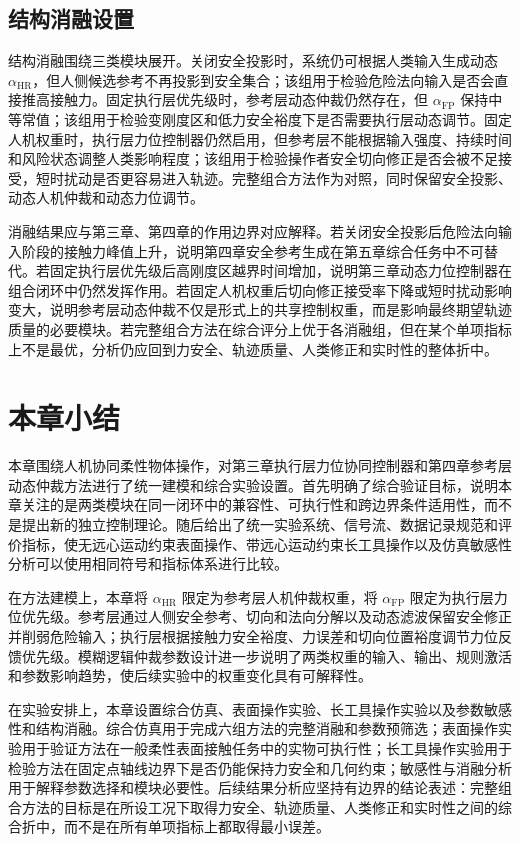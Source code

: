 \subsection{结构消融设置}
\label{subsec:ch5_ablation_setting}

结构消融围绕三类模块展开。关闭安全投影时，系统仍可根据人类输入生成动态 $\alpha_{\mathrm{HR}}$，但人侧候选参考不再投影到安全集合；该组用于检验危险法向输入是否会直接推高接触力。固定执行层优先级时，参考层动态仲裁仍然存在，但 $\alpha_{\mathrm{FP}}$ 保持中等常值；该组用于检验变刚度区和低力安全裕度下是否需要执行层动态调节。固定人机权重时，执行层力位控制器仍然启用，但参考层不能根据输入强度、持续时间和风险状态调整人类影响程度；该组用于检验操作者安全切向修正是否会被不足接受，短时扰动是否更容易进入轨迹。完整组合方法作为对照，同时保留安全投影、动态人机仲裁和动态力位调节。

消融结果应与第三章、第四章的作用边界对应解释。若关闭安全投影后危险法向输入阶段的接触力峰值上升，说明第四章安全参考生成在第五章综合任务中不可替代。若固定执行层优先级后高刚度区越界时间增加，说明第三章动态力位控制器在组合闭环中仍然发挥作用。若固定人机权重后切向修正接受率下降或短时扰动影响变大，说明参考层动态仲裁不仅是形式上的共享控制权重，而是影响最终期望轨迹质量的必要模块。若完整组合方法在综合评分上优于各消融组，但在某个单项指标上不是最优，分析仍应回到力安全、轨迹质量、人类修正和实时性的整体折中。

\section{本章小结}
\label{sec:ch5_summary}

本章围绕人机协同柔性物体操作，对第三章执行层力位协同控制器和第四章参考层动态仲裁方法进行了统一建模和综合实验设置。首先明确了综合验证目标，说明本章关注的是两类模块在同一闭环中的兼容性、可执行性和跨边界条件适用性，而不是提出新的独立控制理论。随后给出了统一实验系统、信号流、数据记录规范和评价指标，使无远心运动约束表面操作、带远心运动约束长工具操作以及仿真敏感性分析可以使用相同符号和指标体系进行比较。

在方法建模上，本章将 $\alpha_{\mathrm{HR}}$ 限定为参考层人机仲裁权重，将 $\alpha_{\mathrm{FP}}$ 限定为执行层力位优先级。参考层通过人侧安全参考、切向和法向分解以及动态滤波保留安全修正并削弱危险输入；执行层根据接触力安全裕度、力误差和切向位置裕度调节力位反馈优先级。模糊逻辑仲裁参数设计进一步说明了两类权重的输入、输出、规则激活和参数影响趋势，使后续实验中的权重变化具有可解释性。

在实验安排上，本章设置综合仿真、表面操作实验、长工具操作实验以及参数敏感性和结构消融。综合仿真用于完成六组方法的完整消融和参数预筛选；表面操作实验用于验证方法在一般柔性表面接触任务中的实物可执行性；长工具操作实验用于检验方法在固定点轴线边界下是否仍能保持力安全和几何约束；敏感性与消融分析用于解释参数选择和模块必要性。后续结果分析应坚持有边界的结论表述：完整组合方法的目标是在所设工况下取得力安全、轨迹质量、人类修正和实时性之间的综合折中，而不是在所有单项指标上都取得最小误差。
